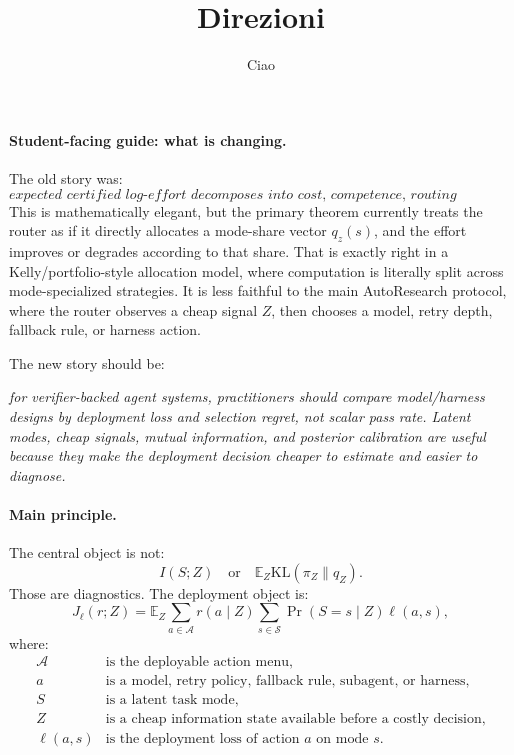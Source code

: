 \documentclass{article}
\title{Direzioni}
\author{Ciao}
\providecommand{\KL}{\mathrm{KL}}
\begin{document}
\maketitle




\paragraph{Student-facing guide: what is changing.}
The old story was:
\[
    \textit{expected certified log-effort decomposes into cost, competence,
    routing information, and routing mismatch.}
\]
This is mathematically elegant, but the primary theorem currently treats the router as if it
directly allocates a mode-share vector \(q_z(s)\), and the effort improves or degrades
according to that share.
That is exactly right in a Kelly/portfolio-style allocation model, where computation is
literally split across mode-specialized strategies.
It is less faithful to the main AutoResearch protocol, where the router observes a cheap
signal \(Z\), then chooses a model, retry depth, fallback rule, or harness action.

The new story should be:
\begin{center}
    \textit{for verifier-backed agent systems, practitioners should compare
    model/harness designs by deployment loss and selection regret, not scalar pass rate.
    Latent modes, cheap signals, mutual information, and posterior calibration are useful
    because they make the deployment decision cheaper to estimate and easier to diagnose.}
\end{center}

\paragraph{Main principle.}
The central object is not:
\[
    I(S;Z)
    \quad\text{or}\quad
    \mathbb E_Z \KL(\pi_Z\|q_Z).
\]
Those are diagnostics.
The deployment object is:
\[
    J_\ell(r;Z)
    =
    \mathbb E_Z
    \sum_{a\in\mathcal A} r(a\mid Z)
    \sum_{s\in\mathcal S}\Pr(S=s\mid Z)\ell(a,s),
\]
where:
\[
\begin{array}{ll}
    \mathcal A & \text{is the deployable action menu},\\
    a          & \text{is a model, retry policy, fallback rule, subagent, or harness},\\
    S          & \text{is a latent task mode},\\
    Z          & \text{is a cheap information state available before a costly decision},\\
    \ell(a,s)  & \text{is the deployment loss of action \(a\) on mode \(s\)}.
\end{array}
\]
\end{document}
